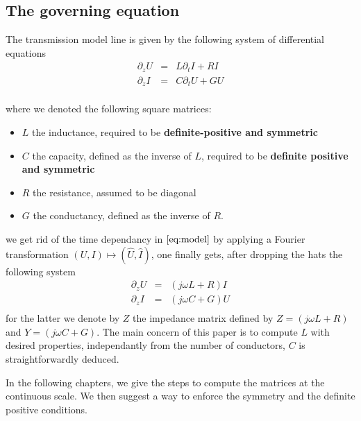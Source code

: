 \renewcommand{\vec}[1]{\ensuremath{\mathbf #1}}

\subsection*{The governing equation}
The transmission model line is given by the following system of differential equations
\begin{equation}
  \label{eq:model}
    \begin{array}{ccc}
      \partial_z U&=& L\partial_t I + RI \\
      \partial_z I&=& C\partial_t U + GU \\
    \end{array}
\end{equation}

where we denoted the following square matrices:
\begin{itemize}
\item  $L$ the inductance, required to be \textbf{definite-positive and symmetric}
\item $C$ the capacity, defined as the inverse of $L$, required to be \textbf{definite positive and symmetric}
\item $R$ the resistance, assumed to be diagonal
\item $G$ the conductancy, defined as the inverse of $R$.
\end{itemize}

we get rid  of the time dependancy in $\eqref{eq:model}$ by
applying a Fourier transformation $(U,I) \mapsto (\hat{U},\hat{I})$, one
finally gets, after dropping the hats the following system
\begin{equation}
  \label{eq:model.fourier}
    \begin{array}{ccc}
      \partial_z U &=& (j\omega L + R) I \\
      \partial_z I &=& (j\omega C  + G) U \\  
    \end{array}
\end{equation}
for the latter we denote by $Z$ the impedance matrix defined by $Z=(j\omega L +
R)$ and $Y=(j\omega C  + G)$. The main concern of this paper is to compute $L$
with desired properties, independantly  from the number of
conductors, $C$ is straightforwardly deduced.

In the following chapters, we give the steps to compute the matrices at the
continuous scale. We then suggest a way to enforce the symmetry and the
definite positive conditions.
